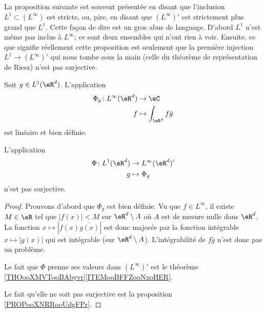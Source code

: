 La proposition suivante est souvent présentée en disant que l'inclusion \( L^1\subset (L^{\infty})\) est stricte, ou, pire, en disant que \( (L^{\infty})'\) est strictement plus grand que \( L^1\). Cette façon de dire est un gros abus de language. D'abord \( L^1\) n'est même pas inclus à \( L^{\infty}\); ce sont deux ensembles qui n'ont rien à voir. Ensuite, ce que signifie réellement cette proposition est seulement que la première injection \( L^1\to (L^{\infty})'\) qui nous tombe sous la main (celle du théorème de représentation de Riesz) n'est pas surjective.
\begin{proposition}     \label{PROPooXXRQooNSBZOi}
Soit \( g\in L^1(\eR^d)\). L'application
\begin{equation}
    \begin{aligned}
        \Phi_g\colon L^{\infty}(\eR^d) & \to \eC                     \\
        f                              & \mapsto \int_{\eR^d}f\bar g
    \end{aligned}
\end{equation}
est linéaire et bien définie.

L'application
\begin{equation}
    \begin{aligned}
        \Phi\colon L^1(\eR^d) & \to L^{\infty}(\eR^d)' \\
        g                     & \mapsto \Phi_g
    \end{aligned}
\end{equation}
n'est pas surjective.
\end{proposition}

\begin{proof}
Prouvons d'abord que \( \Phi_g\) est bien définie. Vu que \( f\in L^{\infty}\), il existe \( M\in \eR\) tel que \( | f(x) |<M\) sur \( \eR^d\setminus A\) où \( A\) est de mesure nulle dans \( \eR^d\). La fonction \( x\mapsto| f(x)\overline{ g(x) } |\) est donc majorée par la fonction intégrable \( x\mapsto | g(x) |\) qui est intégrable (sur \( \eR^d\setminus A\)). L'intégrabilité de \( f\bar g\) n'est donc pas un problème.

Le fait que \( \Phi\) prenne ses valeurs dans \( (L^{\infty})'\) est le théorème \ref{THOooXMVTooBAbyvr}\ref{ITEMooBFFZooNxoHER}.

Le fait qu'elle ne soit pas surjective est la proposition \ref{PROPooXNRRooUdgFPr}.
\end{proof}
